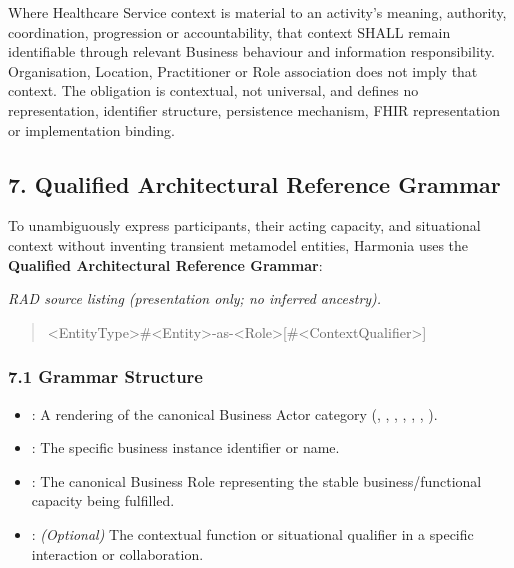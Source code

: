 Where Healthcare Service context is material to an activity's meaning, authority, coordination, progression or accountability, that context SHALL remain identifiable through relevant Business behaviour and information responsibility. Organisation, Location, Practitioner or Role association does not imply that context. The obligation is contextual, not universal, and defines no representation, identifier structure, persistence mechanism, FHIR representation or implementation binding.

\label{rad:metamodel:282}

\par\smallskip
{}\label{rad:metamodel:284}
\subsection*{7. Qualified Architectural Reference Grammar}
\label{rad:metamodel:286}

To unambiguously express participants, their acting capacity, and situational context without inventing transient metamodel entities, Harmonia uses the \textbf{Qualified Architectural Reference Grammar}:

\label{rad:metamodel:288}

\textit{RAD source listing (presentation only; no inferred ancestry).}
\begin{quote}
<EntityType>\#<Entity>-as-<Role>[\#<ContextQualifier>]
\end{quote}
\label{rad:metamodel:292}
\subsubsection*{7.1 Grammar Structure}
\label{rad:metamodel:293}

\begin{itemize}

\item
\texttt{}: A rendering of the canonical Business Actor category (\texttt{}, \texttt{}, \texttt{}, \texttt{}, \texttt{}, \texttt{}, \texttt{}).



\item
\texttt{}: The specific business instance identifier or name.



\item
\texttt{}: The canonical Business Role representing the stable business/\allowbreak{}functional capacity being fulfilled.



\item
\texttt{\seqsplit{[\#<ContextQualifier>]}}: \emph{(Optional)} The contextual function or situational qualifier in a specific interaction or collaboration.



\end{itemize}
\label{rad:metamodel:298}

